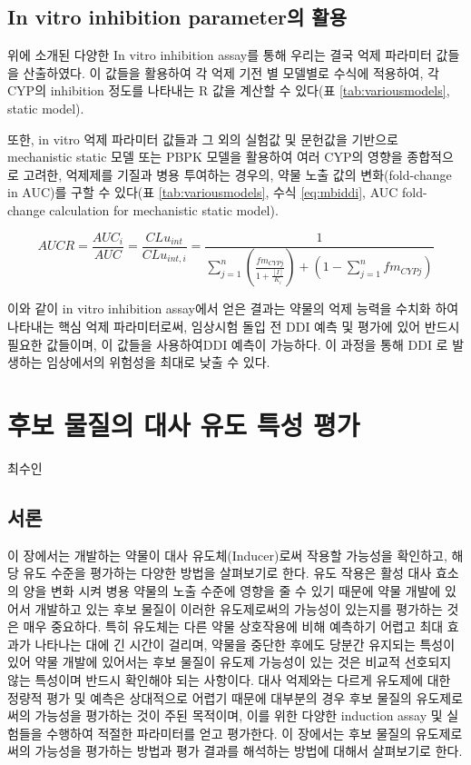 \documentclass[
  11pt,
  krantz2, a4paper, twoside]{krantz}
\begin{document}
\section{In vitro inhibition parameter의 활용}\label{in-vitro-inhibition-parameteruxc758-uxd65cuxc6a9}

위에 소개된 다양한 In vitro inhibition assay를 통해 우리는 결국 억제
파라미터 값들을 산출하였다. 이 값들을 활용하여 각 억제 기전 별 모델별로
수식에 적용하여, 각 CYP의 inhibition 정도를 나타내는 R 값을 계산할 수
있다(표 \ref{tab:variousmodels}, static model).

또한, in vitro 억제 파라미터 값들과 그 외의 실험값 및 문헌값을 기반으로
mechanistic static 모델 또는 PBPK 모델을 활용하여 여러 CYP의 영향을
종합적으로 고려한, 억제제를 기질과 병용 투여하는 경우의, 약물 노출 값의
변화(fold-change in AUC)를 구할 수 있다(표 \ref{tab:variousmodels},
수식 \eqref{eq:mbiddi}, AUC fold-change calculation for mechanistic
static model).

\begin{equation}
AUCR = \frac{AUC_i}{AUC} = \frac{CLu_{int}}{CLu_{int,i}} = 
\frac{1}{\sum_{j=1}^{n} (\frac{fm_{CYPj}}{1+\frac{[I]}{K_i}}) 
+ (1-\sum_{j=1}^{n}fm_{CYPj})}
\label{eq:mbiddi} 
\end{equation}

이와 같이 in vitro inhibition assay에서 얻은 결과는 약물의 억제 능력을
수치화 하여 나타내는 핵심 억제 파라미터로써, 임상시험 돌입 전 DDI 예측
및 평가에 있어 반드시 필요한 값들이며, 이 값들을 사용하여DDI 예측이
가능하다. 이 과정을 통해 DDI 로 발생하는 임상에서의 위험성을 최대로 낮출
수 있다.

\chapter{후보 물질의 대사 유도 특성 평가}\label{Induction}

\Large\hfill

최수인

\normalsize

\section{서론}\label{uxc11cuxb860-5}

이 장에서는 개발하는 약물이 대사 유도체(Inducer)로써 작용할 가능성을
확인하고, 해당 유도 수준을 평가하는 다양한 방법을 살펴보기로 한다. 유도
작용은 활성 대사 효소의 양을 변화 시켜 병용 약물의 노출 수준에 영향을 줄
수 있기 때문에 약물 개발에 있어서 개발하고 있는 후보 물질이 이러한
유도제로써의 가능성이 있는지를 평가하는 것은 매우 중요하다. 특히
유도체는 다른 약물 상호작용에 비해 예측하기 어렵고 최대 효과가 나타나는
대에 긴 시간이 걸리며, 약물을 중단한 후에도 당분간 유지되는 특성이 있어
약물 개발에 있어서는 후보 물질이 유도제 가능성이 있는 것은 비교적
선호되지 않는 특성이며 반드시 확인해야 되는 사항이다. 대사 억제와는
다르게 유도제에 대한 정량적 평가 및 예측은 상대적으로 어렵기 때문에
대부분의 경우 후보 물질의 유도제로써의 가능성을 평가하는 것이 주된
목적이며, 이를 위한 다양한 induction assay 및 실험들을 수행하여 적절한
파라미터를 얻고 평가한다. 이 장에서는 후보 물질의 유도제로써의 가능성을
평가하는 방법과 평가 결과를 해석하는 방법에 대해서 살펴보기로 한다.
\end{document}
